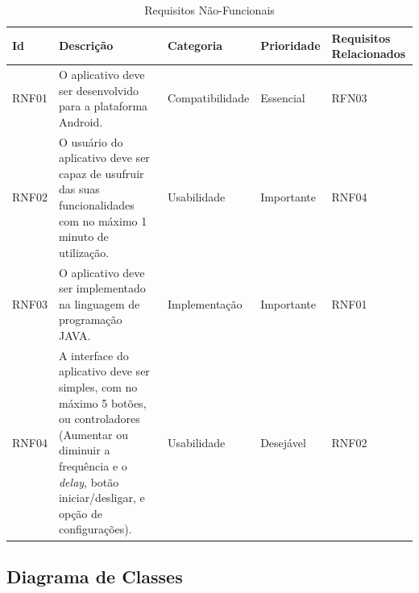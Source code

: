 \begin{table}[H]
	\caption{Requisitos N\~ao-Funcionais}\label{tab:reqnaofuncionais}
	\centering
	\begin{tabular}{|p{1.0cm}|p{5.0cm}|p{2.5cm}|p{2.0cm}|p{2.5cm}|}
		\hline
		\textbf{Id} & \textbf{Descri\c{c}\~ao}& \textbf{Categoria} & \textbf{Prioridade} & \textbf{Requisitos Relacionados}\\
		\hline
		RNF01 & O aplicativo deve ser desenvolvido para a plataforma Android. & Compatibilidade & Essencial & RFN03\\
		\hline
		RNF02 & O usu\'ario do aplicativo deve ser capaz de usufruir das suas funcionalidades com no m\'aximo 1 minuto de utiliza\c{c}\~ao. & Usabilidade & Importante & RNF04 \\
		\hline
		RNF03 & O aplicativo deve ser implementado na linguagem de programa\c{c}\~ao JAVA. & Implementa\c{c}\~ao  & Importante & RNF01\\
		\hline
		RNF04 & A interface do aplicativo deve ser simples, com no m\'aximo 5 bot\~oes, ou controladores (Aumentar ou diminuir a frequ\^encia e o \textit{delay}, bot\~ao iniciar/desligar, e op\c{c}\~ao de configura\c{c}\~oes). & Usabilidade & Desej\'avel & RNF02\\
		\hline
	\end{tabular}
\end{table}


\subsection{Diagrama de Classes}

